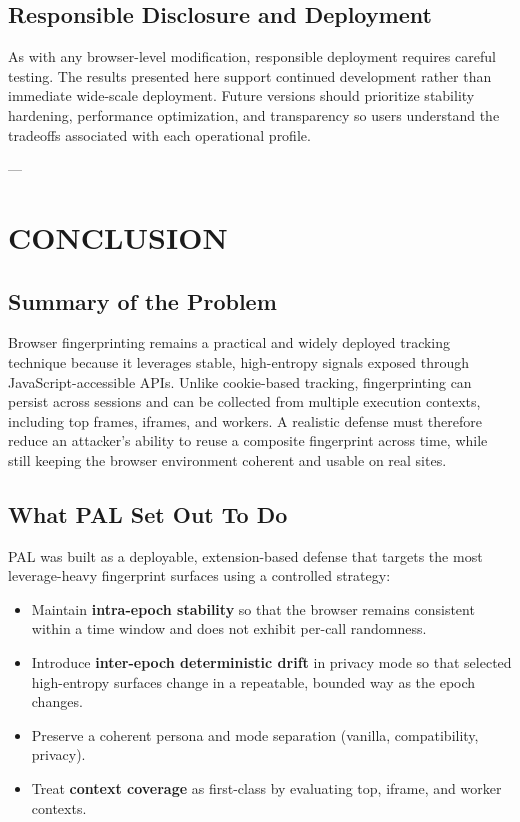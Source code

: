 \documentclass[11pt]{report}
\begin{document}
\section{Responsible Disclosure and Deployment}

As with any browser-level modification, responsible deployment requires careful testing. The results presented here support continued development rather than immediate wide-scale deployment. Future versions should prioritize stability hardening, performance optimization, and transparency so users understand the tradeoffs associated with each operational profile.

---

\chapter{CONCLUSION}

\section{Summary of the Problem}

Browser fingerprinting remains a practical and widely deployed tracking technique because it leverages stable, high-entropy signals exposed through JavaScript-accessible APIs. Unlike cookie-based tracking, fingerprinting can persist across sessions and can be collected from multiple execution contexts, including top frames, iframes, and workers. A realistic defense must therefore reduce an attacker’s ability to reuse a composite fingerprint across time, while still keeping the browser environment coherent and usable on real sites.

\section{What PAL Set Out To Do}

PAL was built as a deployable, extension-based defense that targets the most leverage-heavy fingerprint surfaces using a controlled strategy:

\begin{itemize}
    \item Maintain \textbf{intra-epoch stability} so that the browser remains consistent within a time window and does not exhibit per-call randomness.
    \item Introduce \textbf{inter-epoch deterministic drift} in privacy mode so that selected high-entropy surfaces change in a repeatable, bounded way as the epoch changes.
    \item Preserve a coherent persona and mode separation (vanilla, compatibility, privacy).
    \item Treat \textbf{context coverage} as first-class by evaluating top, iframe, and worker contexts.
\end{itemize}
\end{document}
